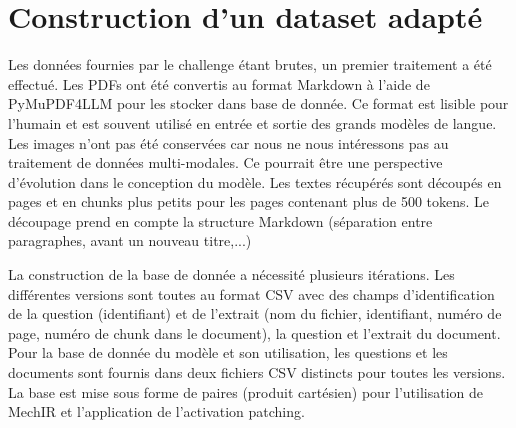 \section{Construction d'un dataset adapté}



    Les données fournies par le challenge étant brutes, un premier traitement a été effectué. Les PDFs ont été convertis au format Markdown à l'aide de PyMuPDF4LLM \cite{artifex_software_pymupdf4llm_2026} pour les stocker dans base de donnée. Ce format est lisible pour l'humain et est souvent utilisé en entrée et sortie des grands modèles de langue. Les images n'ont pas été conservées car nous ne nous intéressons pas au traitement de données multi-modales. Ce pourrait être une perspective d'évolution dans le conception du modèle. Les textes récupérés sont découpés en pages et en chunks plus petits pour les pages contenant plus de 500 tokens. Le découpage prend en compte la structure Markdown (séparation entre paragraphes, avant un nouveau titre,...)

    La construction de la base de donnée a nécessité plusieurs itérations. Les différentes versions sont toutes au format CSV avec des champs d'identification de la question (identifiant) et de l'extrait (nom du fichier, identifiant, numéro de page, numéro de chunk dans le document), la question et l'extrait du document. Pour la base de donnée du modèle et son utilisation, les questions et les documents sont fournis dans deux fichiers CSV distincts pour toutes les versions. La base est mise sous forme de paires (produit cartésien) pour l'utilisation de MechIR et l'application de l'activation patching.

